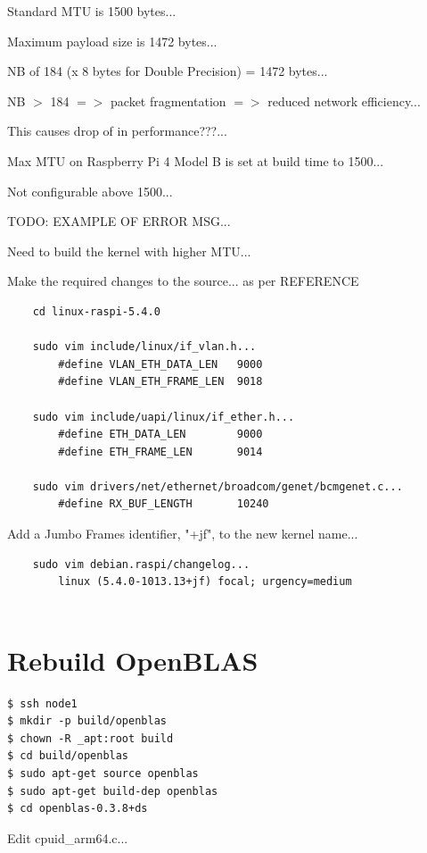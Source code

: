 \documentclass{report}
\begin{document}
Standard MTU is 1500 bytes...

Maximum payload size is 1472 bytes...

NB of 184 (x 8 bytes for Double Precision) = 1472 bytes...

NB $>$ 184 $=>$ packet fragmentation $=>$ reduced network efficiency...

This causes drop of in performance???...

Max MTU on Raspberry Pi 4 Model B is set at build time to 1500...

Not configurable above 1500...

TODO: EXAMPLE OF ERROR MSG...

Need to build the kernel with higher MTU...


Make the required changes to the source... as per REFERENCE

\begin{verbatim}
    cd linux-raspi-5.4.0 

    sudo vim include/linux/if_vlan.h...
        #define VLAN_ETH_DATA_LEN   9000
        #define VLAN_ETH_FRAME_LEN  9018
    
    sudo vim include/uapi/linux/if_ether.h...
        #define ETH_DATA_LEN        9000
        #define ETH_FRAME_LEN       9014
    
    sudo vim drivers/net/ethernet/broadcom/genet/bcmgenet.c...
        #define RX_BUF_LENGTH       10240
\end{verbatim}

Add a Jumbo Frames identifier, "+jf", to the new kernel name...

\begin{verbatim}
    sudo vim debian.raspi/changelog...
        linux (5.4.0-1013.13+jf) focal; urgency=medium
        
\end{verbatim}


%
%
\chapter{Rebuild OpenBLAS}

\lstset{style=type}
\begin{lstlisting}
$ ssh node1
$ mkdir -p build/openblas
$ chown -R _apt:root build
$ cd build/openblas
$ sudo apt-get source openblas
$ sudo apt-get build-dep openblas
$ cd openblas-0.3.8+ds
\end{lstlisting}


Edit cpuid\_arm64.c...
\end{document}
